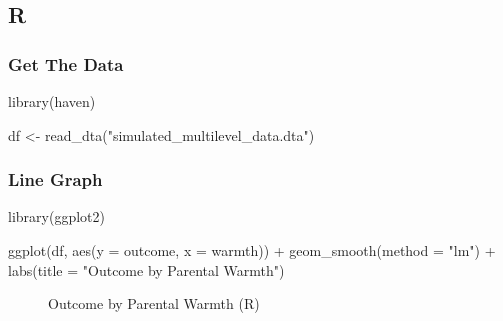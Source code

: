 \documentclass[
  letterpaper,
  DIV=11,
  numbers=noendperiod]{scrreprt}
\newenvironment{Shaded}{\begin{snugshade}}{\end{snugshade}}
\newcommand{\AttributeTok}[1]{\textcolor[rgb]{0.40,0.45,0.13}{#1}}
\newcommand{\FunctionTok}[1]{\textcolor[rgb]{0.28,0.35,0.67}{#1}}
\newcommand{\NormalTok}[1]{\textcolor[rgb]{0.00,0.23,0.31}{#1}}
\newcommand{\OtherTok}[1]{\textcolor[rgb]{0.00,0.23,0.31}{#1}}
\newcommand{\SpecialCharTok}[1]{\textcolor[rgb]{0.37,0.37,0.37}{#1}}
\newcommand{\StringTok}[1]{\textcolor[rgb]{0.13,0.47,0.30}{#1}}
\begin{document}
\subsection{R}

\subsubsection{Get The Data}\label{get-the-data-4}

\begin{Shaded}
\begin{Highlighting}[]
\FunctionTok{library}\NormalTok{(haven)}

\NormalTok{df }\OtherTok{\textless{}{-}} \FunctionTok{read\_dta}\NormalTok{(}\StringTok{"simulated\_multilevel\_data.dta"}\NormalTok{)}
\end{Highlighting}
\end{Shaded}

\subsubsection{Line Graph}\label{line-graph-1}

\begin{Shaded}
\begin{Highlighting}[]
\FunctionTok{library}\NormalTok{(ggplot2)}

\FunctionTok{ggplot}\NormalTok{(df,}
       \FunctionTok{aes}\NormalTok{(}\AttributeTok{y =}\NormalTok{ outcome,}
           \AttributeTok{x =}\NormalTok{ warmth)) }\SpecialCharTok{+}
  \FunctionTok{geom\_smooth}\NormalTok{(}\AttributeTok{method =} \StringTok{"lm"}\NormalTok{) }\SpecialCharTok{+}
\FunctionTok{labs}\NormalTok{(}\AttributeTok{title =} \StringTok{"Outcome by Parental Warmth"}\NormalTok{)}
\end{Highlighting}
\end{Shaded}

\begin{figure}[H]


\caption{\label{fig-Rlfit}Outcome by Parental Warmth (R)}

\end{figure}%
\end{document}

